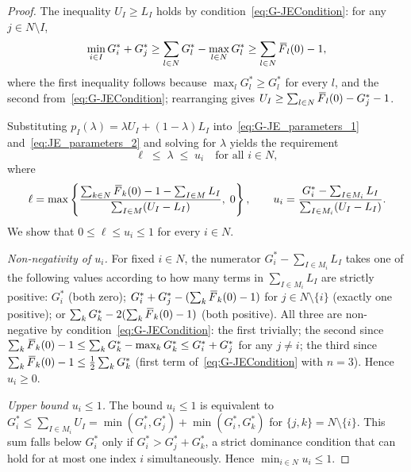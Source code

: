 \documentclass[letterpaper,12pt]{article}
\numberwithin{equation}{section}
\newcommand{\N}{{N}}
\newcommand{\M}{{M}}
\newcommand{\I}{{I}}
\newcommand{\F}{\,\overline{\kern-0.175em F\kern-0em}}
\begin{document}
{\begin{proof}
The inequality $U_\I\ge L_\I$ holds by condition~\eqref{eq:G-JECondition}: for
any $j\in\N\setminus\I$,
\[
\min_{i\in\I}G_i^*+G_j^*
\ge\sum_{l\in\N}G_l^*-\max_{l\in\N}G_l^*
\ge\sum_{l\in\N}\F_l(0)-1,
\]
where the first inequality follows because $\max_l G_l^*\ge G_l^*$ for every $l$,
and the second from~\eqref{eq:G-JECondition}; rearranging gives
$U_\I\ge\sum_{l\in\N}\F_l(0)-G_j^*-1$.

Substituting $p_\I(\lambda)=\lambda U_\I+(1-\lambda)L_\I$
into~\eqref{eq:G-JE_parameters_1} and~\eqref{eq:JE_parameters_2} and solving
for $\lambda$ yields the requirement
\begin{equation}
\label{eq:G-JE_trivariate_lambda}
\ell\;\le\;\lambda\;\le\;u_i\quad\text{for all }i\in\N,
\end{equation}
where
\[
\ell=\max\left\{
\frac{\sum_{k\in\N}\F_k(0)-1-\sum_{\I\in\M}L_{\I}}
     {\sum_{\I\in\M}(U_{\I}-L_{\I})},\;0\right\},
\qquad
u_i=\frac{G_i^*-\sum_{\I\in\M_i}L_{\I}}
         {\sum_{\I\in\M_i}(U_{\I}-L_{\I})}.
\]
We show that $0\le\ell\le u_i\le1$ for every $i\in\N$.

\smallskip
\noindent\textit{Non-negativity of $u_i$.}
For fixed $i\in\N$, the numerator $G_i^*-\sum_{\I\in\M_i}L_\I$ takes one of
the following values according to how many terms in $\sum_{\I\in\M_i}L_\I$ are
strictly positive: $G_i^*$ (both zero); $G_i^*+G_j^*-(\sum_k\F_k(0)-1)$ for
$j\in\N\setminus\{i\}$ (exactly one positive); or
$\sum_k G_k^*-2(\sum_k\F_k(0)-1)$ (both positive). All three are non-negative
by condition~\eqref{eq:G-JECondition}: the first trivially; the second since
$\sum_k\F_k(0)-1\le\sum_k G_k^*-\max_k G_k^*\le G_i^*+G_j^*$ for any
$j\ne i$; the third since $\sum_k\F_k(0)-1\le\tfrac{1}{2}\sum_k G_k^*$ (first
term of~\eqref{eq:G-JECondition} with $n=3$). Hence $u_i\ge0$.

\smallskip
\noindent\textit{Upper bound $u_i\le1$.}
The bound $u_i\le1$ is equivalent to
$G_i^*\le\sum_{\I\in\M_i}U_\I=\min(G_i^*,G_j^*)+\min(G_i^*,G_k^*)$ for
$\{j,k\}=\N\setminus\{i\}$. This sum falls below $G_i^*$ only if
$G_i^*>G_j^*+G_k^*$, a strict dominance condition that can hold for at most
one index $i$ simultaneously. Hence $\min_{i\in\N}u_i\le1$.


\end{proof}}
\end{document}
